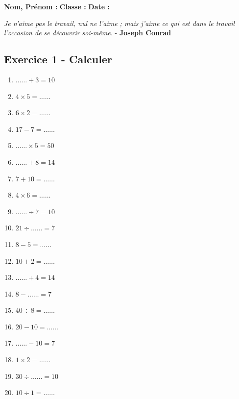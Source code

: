 \Pointilles[47]

\newpage


\textbf{Nom, Prénom :} \hspace{8cm} \textbf{Classe :} \hspace{3cm} \textbf{Date :}\\
\vspace{-0.8cm}
\begin{center}
  \textit{Je n'aime pas le travail, nul ne l'aime ; mais j'aime ce qui est dans le travail l'occasion de se découvrir soi-même.}  - \textbf{Joseph Conrad}
\end{center}
\vspace{-0.8cm}

\subsection*{Exercice 1 - Calculer}

\begin{multicols}{3}\noindent
    \begin{enumerate}
      \item $\ldots\ldots + 3 = 10$
      \item $4 \times 5 = \ldots\ldots$
      \item $6 \times 2 = \ldots\ldots$
      \item $17 - 7 = \ldots\ldots$
      \item $\ldots\ldots \times 5 = 50$
      \item $\ldots\ldots + 8 = 14$
      \item $7 + 10 = \ldots\ldots$
      \item $4 \times 6 = \ldots\ldots$
      \item $\ldots\ldots \div 7 = 10$
      \item $21 \div \ldots\ldots = 7$
      \item $8 - 5 = \ldots\ldots$
      \item $10 + 2 = \ldots\ldots$
      \item $\ldots\ldots + 4 = 14$
      \item $8 - \ldots\ldots = 7$
      \item $40 \div 8 = \ldots\ldots$
      \item $20 - 10 = \ldots\ldots$
      \item $\ldots\ldots - 10 = 7$
      \item $1 \times 2 = \ldots\ldots$
      \item $30 \div \ldots\ldots = 10$
      \item $10 \div 1 = \ldots\ldots$
    \end{enumerate}
  \end{multicols}

